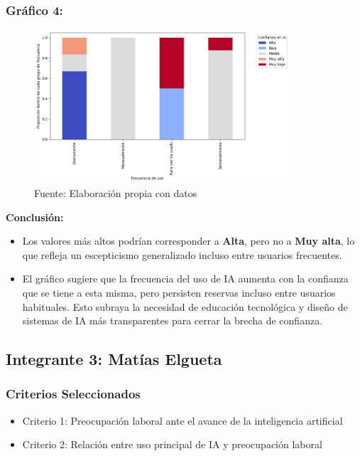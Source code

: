 \documentclass[12pt, a4paper]{article}
\begin{document}
\subsubsection*{Gráfico 4: }
\begin{figure}[H]
    \centering
    \includegraphics[width=0.85\textwidth]{Graficos/spin plot.png}
    \caption[4]{Fuente: Elaboración propia con datos}

\end{figure}


\textbf{Conclusión:} 
\begin{itemize}
    \item Los valores más altos podrían corresponder a \textbf{Alta}, pero no a \textbf{Muy alta}, lo que refleja un escepticismo generalizado incluso entre usuarios frecuentes.

    \item El gráfico sugiere que la frecuencia del uso de IA aumenta con la confianza que se tiene a esta misma, pero persisten reservas incluso entre usuarios habituales. Esto subraya la necesidad de educación tecnológica y diseño de sistemas de IA más transparentes para cerrar la brecha de confianza.
\end{itemize} 


\subsection*{Integrante 3: Matías Elgueta}

\subsubsection*{Criterios Seleccionados}
\begin{itemize}
    \item Criterio 1: Preocupación laboral ante el avance de la inteligencia artificial
    \item Criterio 2: Relación entre uso principal de IA y preocupación laboral
\end{itemize}
\end{document}
